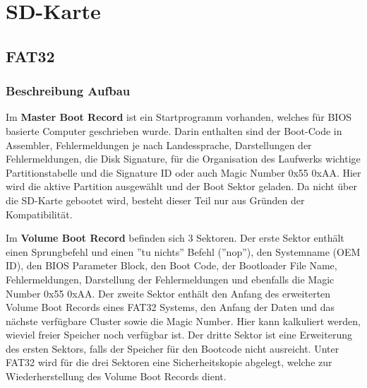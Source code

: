 \section{SD-Karte}\label{Appendix:SD_Karte}

\subsection{FAT32}\label{Appendix:FAT32}

\subsubsection{Beschreibung Aufbau}\label{Appendix:FAT32_Aufbau}

Im \textbf{Master Boot Record} ist ein Startprogramm vorhanden, welches für BIOS basierte Computer geschrieben wurde.
Darin enthalten sind der Boot-Code in Assembler, Fehlermeldungen je nach Landessprache, Darstellungen der Fehlermeldungen, die Disk Signature, für die Organisation des Laufwerks wichtige Partitionstabelle und die Signature ID oder auch Magic Number 0x55 0xAA. Hier wird die aktive Partition ausgewählt und der Boot Sektor geladen. Da nicht über die SD-Karte gebootet wird, besteht dieser Teil nur aus Gründen der Kompatibilität. \cite{german-salescom_datenstruktur_nodate} \cite{milsch_aufbau_2009}

Im \textbf{Volume Boot Record} befinden sich 3 Sektoren. Der erste Sektor enthält einen Sprungbefehl und einen ''tu nichts'' Befehl (''nop''), den Systemname (OEM ID), den BIOS Parameter Block, den Boot Code, der Bootloader File Name, Fehlermeldungen, Darstellung der Fehlermeldungen und ebenfalls die Magic Number 0x55 0xAA. Der zweite Sektor enthält den Anfang des erweiterten Volume Boot Records eines FAT32 Systems, den Anfang der Daten und das nächste verfügbare Cluster sowie die Magic Number. Hier kann kalkuliert werden, wieviel freier Speicher noch verfügbar ist. Der dritte Sektor ist eine Erweiterung des ersten Sektors, falls der Speicher für den Bootcode nicht ausreicht. Unter FAT32 wird für die drei Sektoren eine Sicherheitskopie abgelegt, welche zur Wiederherstellung des Volume Boot Records dient.

